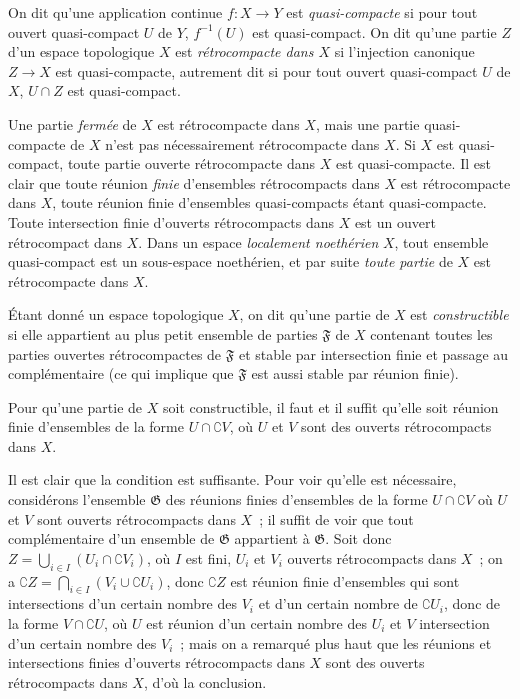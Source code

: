 \begin{definition}[9.1.1]
\label{0.9.1.1-fr}
On dit qu'une application continue $f:X\to Y$ est \emph{quasi-compacte} si
pour tout ouvert quasi-compact $U$ de $Y$, $f^{-1}(U)$ est quasi-compact. On
dit qu'une partie $Z$ d'un espace topologique $X$ est \emph{rétrocompacte
dans $X$} si l'injection canonique $Z\to X$ est quasi-compacte, autrement dit
si pour tout ouvert quasi-compact $U$ de $X$, $U\cap Z$ est quasi-compact.
\end{definition}

Une partie \emph{fermée} de $X$ est rétrocompacte dans $X$, mais une partie
quasi-compacte de $X$ n'est pas nécessairement rétrocompacte dans $X$. Si
$X$ est quasi-compact, toute partie ouverte rétrocompacte dans $X$ est
quasi-compacte. Il est clair que toute réunion \emph{finie} d'ensembles
rétrocompacts dans $X$ est rétrocompacte dans $X$, toute réunion finie
d'ensembles quasi-compacts étant quasi-compacte. Toute intersection finie
d'ouverts rétrocompacts dans $X$ est un ouvert rétrocompact dans $X$. Dans un
espace \emph{localement noethérien} $X$, tout ensemble quasi-compact est un
sous-espace noethérien, et par suite \emph{toute partie} de $X$ est
rétrocompacte dans $X$.

\begin{definition}[9.1.2]
\label{0.9.1.2-fr}
Étant donné un espace topologique $X$, on dit qu'une partie de $X$ est
\emph{constructible} si elle appartient au plus petit ensemble de parties
$\mathfrak{F}$ de $X$ contenant toutes les parties ouvertes rétrocompactes de
$\mathfrak{F}$ et stable par intersection finie et passage au complémentaire
(ce qui implique que $\mathfrak{F}$ est aussi stable par réunion finie).
\end{definition}

\begin{proposition}[9.1.3]
\label{0.9.1.3-fr}
Pour qu'une partie de $X$ soit constructible, il faut et il suffit qu'elle
soit réunion finie d'ensembles de la forme $U\cap\complement{V}$, où $U$ et
$V$ sont des ouverts rétrocompacts dans $X$.
\end{proposition}

Il est clair que la condition est suffisante. Pour voir qu'elle est
nécessaire, considérons l'ensemble $\mathfrak{G}$ des réunions finies
d'ensembles de la forme $U\cap\complement{V}$ où $U$ et $V$ sont ouverts
rétrocompacts dans $X$~; il suffit de voir que tout complémentaire d'un
ensemble de $\mathfrak{G}$ appartient à $\mathfrak{G}$. Soit donc
$Z=\bigcup_{i\in I}(U_i\cap\complement{V_i})$, où $I$ est fini, $U_i$ et
$V_i$ ouverts rétrocompacts dans $X$~; on a
$\complement{Z}=\bigcap_{i\in I}(V_i\cup\complement{U_i})$, donc
$\complement{Z}$ est réunion finie d'ensembles qui sont intersections d'un
certain nombre des $V_i$ et d'un certain nombre de $\complement{U_i}$, donc
de la forme
$V\cap\complement{U}$, où $U$ est réunion d'un certain nombre des $U_i$ et
$V$ intersection d'un certain nombre des $V_i$~; mais on a remarqué plus
haut que les réunions et intersections finies d'ouverts rétrocompacts dans
$X$ sont des ouverts rétrocompacts dans $X$, d'où la conclusion.

